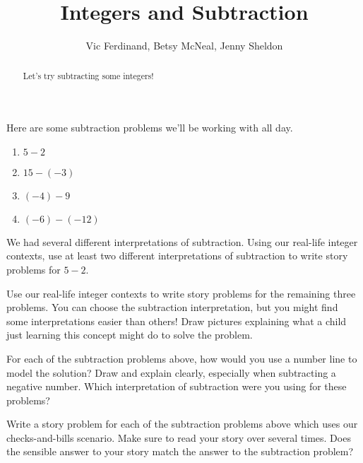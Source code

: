 \documentclass{ximera}
\title{Integers and Subtraction}
\author{Vic Ferdinand, Betsy McNeal, Jenny Sheldon}
\begin{document}
\begin{abstract}
    Let's try subtracting some integers!
\end{abstract}
\maketitle



Here are some subtraction problems we'll be working with all day.

\begin{enumerate}
    \item $5 - 2$
    \item $15 - (-3)$
    \item $(-4) - 9$
    \item $(-6) - (-12)$
\end{enumerate}

\begin{problem}
We had several different interpretations of subtraction.  Using our real-life integer contexts, use at least two different interpretations of subtraction to write story problems for $5 - 2$.

\end{problem}

\begin{problem}
Use our real-life integer contexts to write story problems for the remaining three problems.  You can choose the subtraction interpretation, but you might find some interpretations easier than others!  Draw pictures explaining what a child just learning this concept might do to solve the problem.


\end{problem}

\begin{problem}
For each of the subtraction problems above, how would you use a number line to model the solution?  Draw and explain clearly, especially when subtracting a negative number.  Which interpretation of subtraction were you using for these problems?
\end{problem}

\begin{problem}
Write a story problem for each of the subtraction problems above which uses our checks-and-bills scenario.  Make sure to read your story over several times.  Does the sensible answer to your story match the answer to the subtraction problem?
\end{problem}
\end{document}
